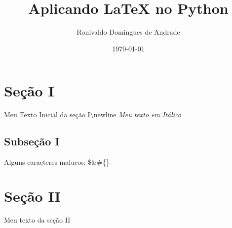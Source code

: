 \documentclass{article}%
\title{Aplicando LaTeX no Python}%
\author{Ronivaldo Domingues de Andrade}%
\date{\today}%
\begin{document}
%
\normalsize%
\maketitle%
\section{Seção I}%
\label{sec:SeoI}%
Meu Texto Inicial da seção I\textbackslash{}newline%
\textit{ Meu texto em Itálico}%
\subsection{Subseção I}%
\label{subsec:SubseoI}%
Alguns caracteres malucos: \$\&\#\{\}

%
\section{Seção II}%
\label{sec:SeoII}%
Meu texto da seção II

%
\end{document}
